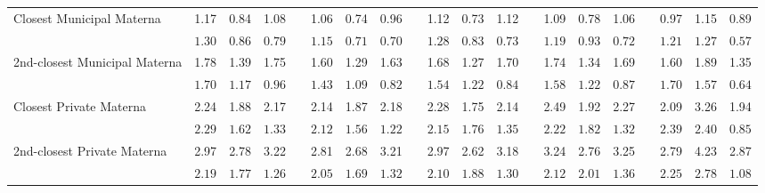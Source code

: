 \begin{center}
{\begin{longtable}{L{5cm} c c c p{.5cm} c c c p{.5cm} c c c p{.5cm} c c c p{.5cm} c c c}
Closest Municipal Materna & 1.17 &      0.84 &      1.08 & &      1.06 &      0.74 &      0.96 & &      1.12 &      0.73 &      1.12 & &      1.09 &      0.78 &      1.06 & &      0.97 &      1.15 &      0.89 \\*
& $\mathit{     1.30}$ & $\mathit{     0.86}$ & $\mathit{     0.79}$ & & $\mathit{     1.15}$ & $\mathit{     0.71}$ & $\mathit{     0.70}$ & & $\mathit{     1.28}$ & $\mathit{     0.83}$ & $\mathit{     0.73}$ & & $\mathit{     1.19}$ & $\mathit{     0.93}$ & $\mathit{     0.72}$ & & $\mathit{     1.21}$ & $\mathit{     1.27}$ & $\mathit{     0.57}$ \\[.7em]
2nd-closest Municipal Materna & 1.78 &      1.39 &      1.75 & &      1.60 &      1.29 &      1.63 & &      1.68 &      1.27 &      1.70 & &      1.74 &      1.34 &      1.69 & &      1.60 &      1.89 &      1.35 \\*
& $\mathit{     1.70}$ & $\mathit{     1.17}$ & $\mathit{     0.96}$ & & $\mathit{     1.43}$ & $\mathit{     1.09}$ & $\mathit{     0.82}$ & & $\mathit{     1.54}$ & $\mathit{     1.22}$ & $\mathit{     0.84}$ & & $\mathit{     1.58}$ & $\mathit{     1.22}$ & $\mathit{     0.87}$ & & $\mathit{     1.70}$ & $\mathit{     1.57}$ & $\mathit{     0.64}$ \\[.7em]
Closest Private Materna & 2.24 &      1.88 &      2.17 & &      2.14 &      1.87 &      2.18 & &      2.28 &      1.75 &      2.14 & &      2.49 &      1.92 &      2.27 & &      2.09 &      3.26 &      1.94 \\*
& $\mathit{     2.29}$ & $\mathit{     1.62}$ & $\mathit{     1.33}$ & & $\mathit{     2.12}$ & $\mathit{     1.56}$ & $\mathit{     1.22}$ & & $\mathit{     2.15}$ & $\mathit{     1.76}$ & $\mathit{     1.35}$ & & $\mathit{     2.22}$ & $\mathit{     1.82}$ & $\mathit{     1.32}$ & & $\mathit{     2.39}$ & $\mathit{     2.40}$ & $\mathit{     0.85}$ \\[.7em]
2nd-closest Private Materna & 2.97 &      2.78 &      3.22 & &      2.81 &      2.68 &      3.21 & &      2.97 &      2.62 &      3.18 & &      3.24 &      2.76 &      3.25 & &      2.79 &      4.23 &      2.87 \\*
& $\mathit{     2.19}$ & $\mathit{     1.77}$ & $\mathit{     1.26}$ & & $\mathit{     2.05}$ & $\mathit{     1.69}$ & $\mathit{     1.32}$ & & $\mathit{     2.10}$ & $\mathit{     1.88}$ & $\mathit{     1.30}$ & & $\mathit{     2.12}$ & $\mathit{     2.01}$ & $\mathit{     1.36}$ & & $\mathit{     2.25}$ & $\mathit{     2.78}$ & $\mathit{     1.08}$ \\[.7em]

\end{longtable}}
\end{center}
